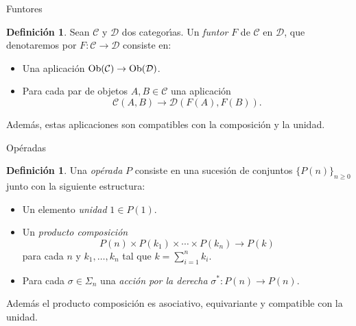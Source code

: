 \documentclass[12pt,aspectratio=169]{beamer}
\numberwithin{equation}{section}
\theoremstyle{definition}
\newtheorem{defi}[teo]{Definici\'on}
\begin{document}
\begin{frame}{Funtores}
    \begin{defi}
        Sean $\mathcal{C}$ y $\mathcal{D}$ dos categor\'{\i}as. Un \emph{funtor} $F$ de $\mathcal{C}$ en $\mathcal{D}$, que denotaremos por $F\colon\mathcal{C}\to \mathcal{D}$ consiste en:
        \begin{itemize}
            \item Una aplicaci\'on ${\rm Ob}(\mathcal{C})\to {\rm Ob}(\mathcal{D})$. %
            \item Para cada par de objetos $A,B\in\mathcal{C}$ una aplicaci\'on
                  $$
                      \mathcal{C}(A,B)\longrightarrow\mathcal{D}(F(A), F(B)).
                  $$
        \end{itemize}
        Adem\'as, estas aplicaciones son compatibles con la composici\'on y la unidad. %
    \end{defi}

\end{frame}

\begin{frame}{Op\'eradas}
\begin{defi}
    Una \emph{op\'erada} $P$ consiste en una sucesi\'on de conjuntos $\{P(n)\}_{n\ge 0}$ junto con la siguiente estructura:
    \begin{itemize}
        \item Un elemento \emph{unidad} $1\in P(1)$.
        \item Un \emph{producto composici\'on}
              $$
                  P(n)\times P(k_1) \times\cdots\times P(k_n)\longrightarrow P(k)
              $$
              para cada $n$ y $k_1,\dots,k_n$ tal que $k=\sum_{i=1}^{n}{k_i}$.
        \item Para cada $\sigma\in\Sigma_n$ una \emph{acci\'on por la derecha} $\sigma^*\colon P(n)\to P(n)$.
    \end{itemize}
    Adem\'as el producto composici\'on es asociativo, equivariante y compatible con la unidad.
\end{defi}

\end{frame}
\end{document}
